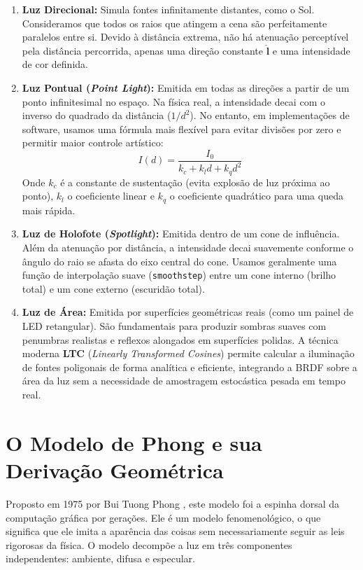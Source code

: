 \begin{enumerate}
    \item \textbf{Luz Direcional:} Simula fontes infinitamente distantes, como o Sol. Consideramos que todos os raios que atingem a cena são perfeitamente paralelos entre si. Devido à distância extrema, não há atenuação perceptível pela distância percorrida, apenas uma direção constante $\hat{\mathbf{l}}$ e uma intensidade de cor definida.
    \item \textbf{Luz Pontual (\textit{Point Light}):} Emitida em todas as direções a partir de um ponto infinitesimal no espaço. Na física real, a intensidade decai com o inverso do quadrado da distância ($1/d^2$). No entanto, em implementações de software, usamos uma fórmula mais flexível para evitar divisões por zero e permitir maior controle artístico:
    \begin{equation}
        I(d) = \frac{I_0}{k_c + k_l d + k_q d^2}
    \end{equation}
    Onde $k_c$ é a constante de sustentação (evita explosão de luz próxima ao ponto), $k_l$ o coeficiente linear e $k_q$ o coeficiente quadrático para uma queda mais rápida.
    \item \textbf{Luz de Holofote (\textit{Spotlight}):} Emitida dentro de um cone de influência. Além da atenuação por distância, a intensidade decai suavemente conforme o ângulo do raio se afasta do eixo central do cone. Usamos geralmente uma função de interpolação suave (\texttt{smoothstep}) entre um cone interno (brilho total) e um cone externo (escuridão total).
    \item \textbf{Luz de Área:} Emitida por superfícies geométricas reais (como um painel de LED retangular). São fundamentais para produzir sombras suaves com penumbras realistas e reflexos alongados em superfícies polidas. A técnica moderna \textbf{LTC} (\textit{Linearly Transformed Cosines}) permite calcular a iluminação de fontes poligonais de forma analítica e eficiente, integrando a BRDF sobre a área da luz sem a necessidade de amostragem estocástica pesada em tempo real.
\end{enumerate}

\section{O Modelo de Phong e sua Derivação Geométrica}

Proposto em 1975 por Bui Tuong Phong \cite{phong1975illumination}, este modelo foi a espinha dorsal da computação gráfica por gerações. Ele é um modelo fenomenológico, o que significa que ele imita a aparência das coisas sem necessariamente seguir as leis rigorosas da física. O modelo decompõe a luz em três componentes independentes: ambiente, difusa e especular.

